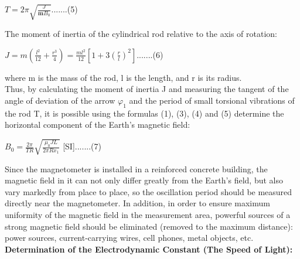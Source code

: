 \documentclass[a4paper, 12pt]{article}%
\begin{document}
\begin{center}
$T = 2\pi \sqrt{\frac{J}{\textbf{m}B_0}}$.......(5)
\end{center}

The moment of inertia of the cylindrical rod relative to the axis
of rotation:
\begin{center}
$J= m(\frac{l^2}{12}+\frac{r^3}{4}) = \frac{ml^2}{12}[1+3(\frac{r}{l})^2]$.......(6)
\end{center}
where m is the mass of the rod, l is the length, and r is its radius.\\
\newline
Thus, by calculating the moment of inertia J and measuring the tangent of the angle of deviation of the arrow $\varphi_1$ and the period of small torsional vibrations of the rod T, it is possible using the formulas (1), (3), (4) and (5) determine the horizontal component of the Earth's magnetic field:

\begin{center}
$B_0 = \frac{2\pi}{TR}\sqrt{\frac{\mu_0JL}{2\pi Rx_1}}$ [SI].......(7)
\end{center}

Since the magnetometer is installed in a reinforced concrete building, the magnetic field in it can not only differ greatly from the Earth's field, but also vary markedly from place to place, so the oscillation period should be measured directly near the magnetometer. In addition, in order to ensure maximum uniformity of the magnetic field in the measurement area, powerful sources of a strong magnetic field should be eliminated (removed to the maximum distance): power sources, current-carrying wires, cell phones, metal objects, etc.\\
\newline
\textbf{Determination of the Electrodynamic Constant (The Speed of Light):}\\
\end{document}
